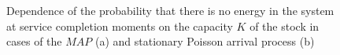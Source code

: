 \documentclass[12pt, a4paper]{article}
\begin{document}
\begin{figure}[h]
\begin{minipage}[h]{0.49\linewidth}
\end{minipage}
\caption{Dependence of the probability that there is no energy in the system at service completion moments on the capacity $K$ of the stock
in cases of the $MAP$ (a) and stationary Poisson arrival process (b)}
\end{figure}


\begin{figure}[h]
\begin{minipage}[h]{0.49\linewidth}
\end{minipage}
\hfill
\begin{minipage}[h]{0.49\linewidth}

\end{minipage}
\end{figure}
\end{document}
